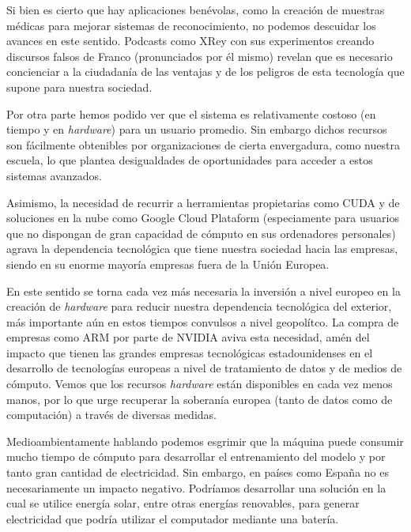\documentclass[../main.tex]{subfiles}
\begin{document}
Si bien es cierto que hay aplicaciones benévolas, como la creación de muestras médicas para mejorar sistemas de reconocimiento, no podemos descuidar los avances en este sentido. Podcasts como XRey con sus experimentos creando discursos falsos de Franco (pronunciados por él mismo) revelan que es necesario concienciar a la ciudadanía de las ventajas y de los peligros de esta tecnología que supone para nuestra sociedad. \newline

Por otra parte hemos podido ver que el sistema es relativamente costoso (en tiempo y en \textit{hardware}) para un usuario promedio. Sin embargo dichos recursos son fácilmente obtenibles por organizaciones de cierta envergadura, como nuestra escuela, lo que plantea desigualdades de oportunidades para acceder a estos sistemas avanzados. \newline

Asimismo, la necesidad de recurrir a herramientas propietarias como CUDA y de soluciones en la nube como Google Cloud Plataform (especiamente para usuarios que no dispongan de gran capacidad de cómputo en sus ordenadores personales) agrava la dependencia tecnológica que tiene nuestra sociedad hacia las empresas, siendo en su enorme mayoría empresas fuera de la Unión Europea. \newline

En este sentido se torna cada vez más necesaria la inversión a nivel europeo en la creación de \textit{hardware} para reducir nuestra dependencia tecnológica del exterior, más importante aún en estos tiempos convulsos a nivel geopolítco. La compra de empresas como ARM por parte de NVIDIA \cite{Roca2020} aviva esta necesidad, amén del impacto que tienen las grandes empresas tecnológicas estadounidenses en el desarrollo de tecnologías europeas a nivel de tratamiento de datos y de medios de cómputo. Vemos que los recursos \textit{hardware} están disponibles en cada vez menos manos, por lo que urge recuperar la soberanía europea (tanto de datos como de computación) a través de diversas medidas. \newline

Medioambientamente hablando podemos esgrimir que la máquina puede consumir mucho tiempo de cómputo para desarrollar el entrenamiento del modelo y por tanto gran cantidad de electricidad. Sin embargo, en países como España no es necesariamente un impacto negativo. Podríamos desarrollar una solución en la cual se utilice energía solar, entre otras energías renovables, para generar electricidad que podría utilizar el computador mediante una batería. \newline
\end{document}

